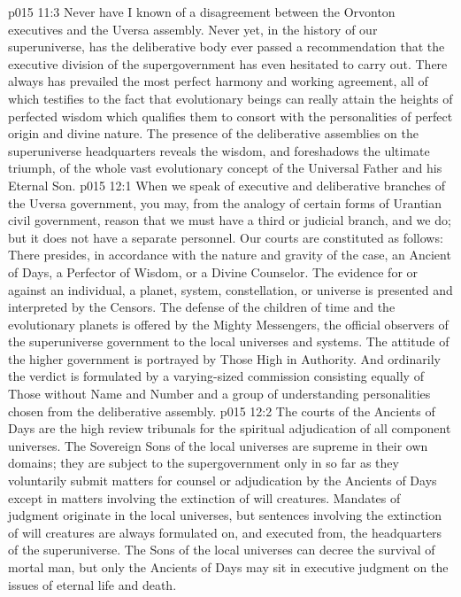 \vs p015 11:3 Never have I known of a disagreement between the Orvonton executives and the Uversa assembly. Never yet, in the history of our superuniverse, has the deliberative body ever passed a recommendation that the executive division of the supergovernment has even hesitated to carry out. There always has prevailed the most perfect harmony and working agreement, all of which testifies to the fact that evolutionary beings can really attain the heights of perfected wisdom which qualifies them to consort with the personalities of perfect origin and divine nature. The presence of the deliberative assemblies on the superuniverse headquarters reveals the wisdom, and foreshadows the ultimate triumph, of the whole vast evolutionary concept of the Universal Father and his Eternal Son.
\vs p015 12:1 When we speak of executive and deliberative branches of the Uversa government, you may, from the analogy of certain forms of Urantian civil government, reason that we must have a third or judicial branch, and we do; but it does not have a separate personnel. Our courts are constituted as follows: There presides, in accordance with the nature and gravity of the case, an Ancient of Days, a Perfector of Wisdom, or a Divine Counselor. The evidence for or against an individual, a planet, system, constellation, or universe is presented and interpreted by the Censors. The defense of the children of time and the evolutionary planets is offered by the Mighty Messengers, the official observers of the superuniverse government to the local universes and systems. The attitude of the higher government is portrayed by Those High in Authority. And ordinarily the verdict is formulated by a varying\hyp{}sized commission consisting equally of Those without Name and Number and a group of understanding personalities chosen from the deliberative assembly.
\vs p015 12:2 The courts of the Ancients of Days are the high review tribunals for the spiritual adjudication of all component universes. The Sovereign Sons of the local universes are supreme in their own domains; they are subject to the supergovernment only in so far as they voluntarily submit matters for counsel or adjudication by the Ancients of Days except in matters involving the extinction of will creatures. Mandates of judgment originate in the local universes, but sentences involving the extinction of will creatures are always formulated on, and executed from, the headquarters of the superuniverse. The Sons of the local universes can decree the survival of mortal man, but only the Ancients of Days may sit in executive judgment on the issues of eternal life and death.
